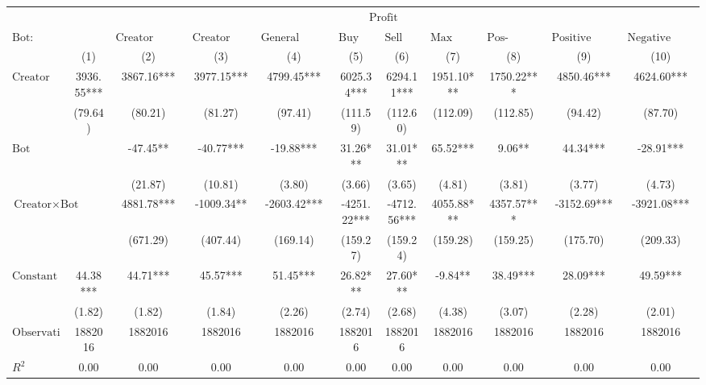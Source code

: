 \begin{tabular}{lcccccccccc}
\hline
 & \multicolumn{10}{c}{$\text{Profit}$} \\
 $\text{Bot}:$ &  & $\text{Creator Launch Bundle}$ & $\text{Creator Buy Bundle}$ & $\text{General Launch Bundle}$ & $\text{Buy Bundle}$ & $\text{Sell Bundle}$ & $\text{Max Same Txn}$ & $\text{Pos-\#Swaps Ratio}$ & $\text{Positive Comment Bot}$ & $\text{Negative Comment Bot}$ \\
 & (1) & (2) & (3) & (4) & (5) & (6) & (7) & (8) & (9) & (10)\\
\hline
$\text{Creator}$ & 3936.55*** & 3867.16*** & 3977.15*** & 4799.45*** & 6025.34*** & 6294.11*** & 1951.10*** & 1750.22*** & 4850.46*** & 4624.60*** \\
 & (79.64) & (80.21) & (81.27) & (97.41) & (111.59) & (112.60) & (112.09) & (112.85) & (94.42) & (87.70) \\
$\text{Bot}$ &  & -47.45** & -40.77*** & -19.88*** & 31.26*** & 31.01*** & 65.52*** & 9.06** & 44.34*** & -28.91*** \\
 &  & (21.87) & (10.81) & (3.80) & (3.66) & (3.65) & (4.81) & (3.81) & (3.77) & (4.73) \\
$\text{Creator} \times \text{Bot}$ &  & 4881.78*** & -1009.34** & -2603.42*** & -4251.22*** & -4712.56*** & 4055.88*** & 4357.57*** & -3152.69*** & -3921.08*** \\
 &  & (671.29) & (407.44) & (169.14) & (159.27) & (159.24) & (159.28) & (159.25) & (175.70) & (209.33) \\
$\text{Constant}$ & 44.38*** & 44.71*** & 45.57*** & 51.45*** & 26.82*** & 27.60*** & -9.84** & 38.49*** & 28.09*** & 49.59*** \\
 & (1.82) & (1.82) & (1.84) & (2.26) & (2.74) & (2.68) & (4.38) & (3.07) & (2.28) & (2.01) \\
$\text{Observations}$ & 1882016 & 1882016 & 1882016 & 1882016 & 1882016 & 1882016 & 1882016 & 1882016 & 1882016 & 1882016 \\
$R^2$ & 0.00 & 0.00 & 0.00 & 0.00 & 0.00 & 0.00 & 0.00 & 0.00 & 0.00 & 0.00 \\
\hline
\end{tabular}